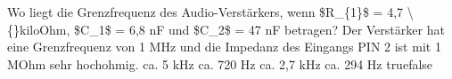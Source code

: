     {Wo liegt die Grenzfrequenz des Audio-Verstärkers, wenn \$R\_\{1\}\$ = 4,7 \textbackslash\{\}kiloOhm, \$C\_1\$ = 6,8 nF und \$C\_2\$ = 47 nF betragen? Der Verstärker hat eine Grenzfrequenz von 1 MHz und die Impedanz des Eingangs PIN 2 ist mit 1 MOhm sehr hochohmig.}
    {ca. 5 kHz}
    {ca. 720 Hz}
    {ca. 2,7 kHz}
    {ca. 294 Hz}
    {true}{false}